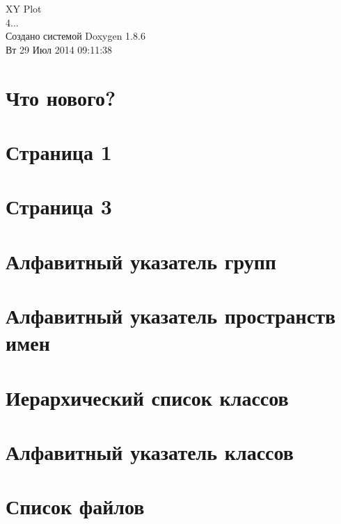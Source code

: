 \documentclass[twoside]{book}
\newcommand{\clearemptydoublepage}{%
  \newpage{\pagestyle{empty}\cleardoublepage}%
}
\begin{document}
\hypersetup{pageanchor=false}
\begin{titlepage}
\vspace*{7cm}
\begin{center}%
{\Large X\-Y Plot \\[1ex]\large 4... }\\
\vspace*{1cm}
{\large Создано системой Doxygen 1.8.6}\\
\vspace*{0.5cm}
{\small Вт 29 Июл 2014 09:11:38}\\
\end{center}
\end{titlepage}
\clearemptydoublepage
\tableofcontents
\clearemptydoublepage
{}
\hypersetup{pageanchor=true}

\chapter{Что нового?}
\label{page1}
\hypertarget{page1}{}

\chapter{Страница 1}
\label{page2}
\hypertarget{page2}{}

\chapter{Страница 3}
\label{page3}
\hypertarget{page3}{}

\chapter{Алфавитный указатель групп}

\chapter{Алфавитный указатель пространств имен}

\chapter{Иерархический список классов}

\chapter{Алфавитный указатель классов}

\chapter{Список файлов}

\end{document}
